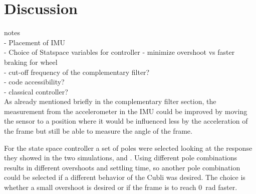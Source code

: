 \chapter{Discussion}

{\Large notes} \\
- Placement of IMU\\
- Choice of Statspace variables for controller - minimize overshoot vs faster braking for wheel\\
- cut-off frequency of the complementary filter?\\
- code accessibility?\\
- classical controller?\\


As already mentioned briefly in the complementary filter section, the measurement from the accelerometer in the IMU could be improved by moving the sensor to a position where it would be influenced less by the acceleration of the frame but still be able to measure the angle of the frame. 

For the state space controller a set of poles were selected looking at the response they showed in the two simulations,  and . Using different pole combinations results in different overshoots and settling time, so another pole combination could be selected if a different behavior of the Cubli was desired. The choice is whether a small overshoot is desired or if the frame is to reach \SI{0}{rad} faster.

